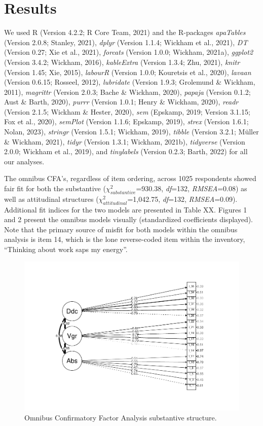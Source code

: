 \documentclass[
  man]{apa7}
\begin{document}
\hypertarget{results-1}{%
\section{Results}\label{results-1}}

We used R (Version 4.2.2; R Core Team, 2021) and the R-packages \emph{apaTables} (Version 2.0.8; Stanley, 2021), \emph{dplyr} (Version 1.1.4; Wickham et al., 2021), \emph{DT} (Version 0.27; Xie et al., 2021), \emph{forcats} (Version 1.0.0; Wickham, 2021a), \emph{ggplot2} (Version 3.4.2; Wickham, 2016), \emph{kableExtra} (Version 1.3.4; Zhu, 2021), \emph{knitr} (Version 1.45; Xie, 2015), \emph{labourR} (Version 1.0.0; Kouretsis et al., 2020), \emph{lavaan} (Version 0.6.15; Rosseel, 2012), \emph{lubridate} (Version 1.9.3; Grolemund \& Wickham, 2011), \emph{magrittr} (Version 2.0.3; Bache \& Wickham, 2020), \emph{papaja} (Version 0.1.2; Aust \& Barth, 2020), \emph{purrr} (Version 1.0.1; Henry \& Wickham, 2020), \emph{readr} (Version 2.1.5; Wickham \& Hester, 2020), \emph{sem} (Epskamp, 2019; Version 3.1.15; Fox et al., 2020), \emph{semPlot} (Version 1.1.6; Epskamp, 2019), \emph{strex} (Version 1.6.1; Nolan, 2023), \emph{stringr} (Version 1.5.1; Wickham, 2019), \emph{tibble} (Version 3.2.1; Müller \& Wickham, 2021), \emph{tidyr} (Version 1.3.1; Wickham, 2021b), \emph{tidyverse} (Version 2.0.0; Wickham et al., 2019), and \emph{tinylabels} (Version 0.2.3; Barth, 2022) for all our analyses.

The omnibus CFA's, regardless of item ordering, across 1025 respondents showed fair fit for both the substantive (\(\chi^2_{substantive}\)=930.38, \emph{df}=132, \emph{RMSEA}=0.08) as well as attitudinal structures (\(\chi^2_{attitudinal}\)=1,042.75, \emph{df}=132, \emph{RMSEA}=0.09). Additional fit indices for the two models are presented in Table XX. Figures 1 and 2 present the omnibus models visually (standardized coefficients displayed). Note that the primary source of misfit for both models within the omnibus analysis is item 14, which is the lone reverse-coded item within the inventory, ``Thinking about work saps my energy''.

\begin{figure}
\centering
\includegraphics{EngagementPaper2_files/figure-latex/semplotsub-1.pdf}
\caption{\label{fig:semplotsub}Omnibus Confirmatory Factor Analysis substantive structure.}
\end{figure}
\end{document}
